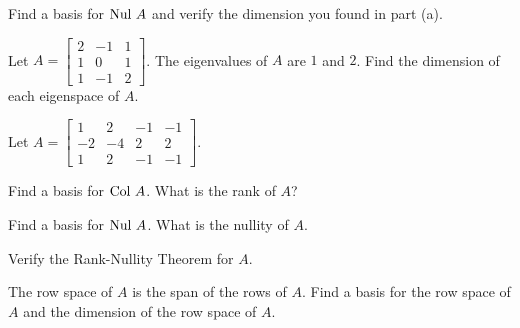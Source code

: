 	\item Find a basis for $\text{Nul } A$ and verify the dimension you found in part (a). 
	
	\ea
	
\item Let $A =  \left[ \begin{array}{crc} 2&-1&1\\ 1&0&1 \\ 1&-1&2\end{array} \right]$. The eigenvalues of $A$ are $1$ and $2$. Find the dimension of each eigenspace of $A$. 


\item Let $A = \left[ \begin{array}{rrrr} 1&2&-1&-1 \\ -2&-4&2&2 \\ 1&2&-1&-1 \end{array} \right]$. 
	\ba
	\item Find a basis for $\text{Col } A$. What is the rank of $A$? 
	\item Find a basis for $\text{Nul } A$. What is the nullity of $A$. 
	\item Verify the Rank-Nullity Theorem for $A$. 
	\item The row space of $A$ is the span of the rows of $A$. Find a basis for the row space of $A$ and the dimension of the row space of $A$. 
	\ea

